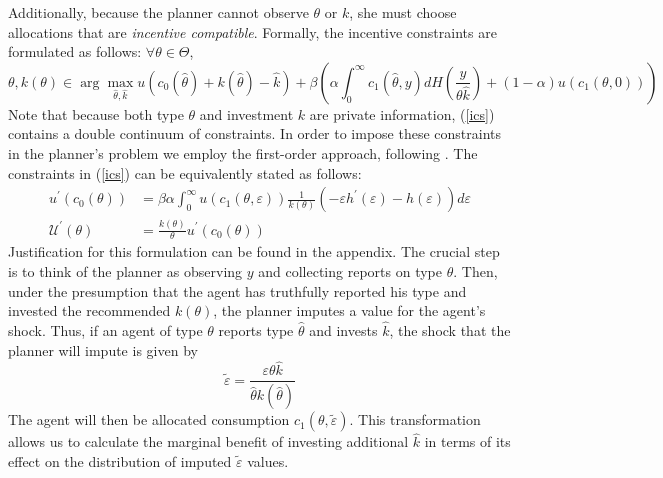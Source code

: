 \documentclass[11pt]{article}
\newcommand{\p}{\prime}
\newcommand{\U}{\mathcal{U}}
\begin{document}
Additionally, because the planner cannot observe \( \theta \) or \( k \), she must choose allocations that are \textit{incentive compatible}. Formally, the incentive constraints are formulated as follows: \( \forall \theta\in\Theta \),
\begin{equation}
    \theta, k(\theta)\in\arg\max_{\hat{\theta},\hat{k}}u\left( c_0(\hat{\theta}) + k(\hat{\theta}) - \hat{k} \right) + \beta\left( \alpha\int_{0}^{\infty}c_1(\hat{\theta},y)dH\left( \frac{y}{\theta \hat{k}} \right) + (1 - \alpha)u\left( c_1\left( \theta,0 \right) \right) \right) \label{ics}
\end{equation}
Note that because both type \( \theta \) and investment \( k \) are private information, (\ref{ics}) contains a double continuum of constraints. In order to impose these constraints in the planner's problem we employ the first-order approach, following \cite{jewitt1988justifying}. The constraints in (\ref{ics}) can be equivalently stated as follows:
\begin{align}
    u^\p\left( c_0(\theta) \right) &= \beta\alpha\int_{0}^{\infty}u\left( c_1\left( \theta,\varepsilon \right) \right)\frac{1}{k(\theta)}\left( -\varepsilon h^\p(\varepsilon) - h(\varepsilon) \right)d\varepsilon \label{ic_k} \\
    \U^\p(\theta) &= \frac{k(\theta)}{\theta}u^\p\left( c_0(\theta) \right) \label{ic_t}
\end{align}
Justification for this formulation can be found in the appendix. The crucial step is to think of the planner as observing \( y \) and collecting reports on type \( \theta \). Then, under the presumption that the agent has truthfully reported his type and invested the recommended \( k\left( \theta \right) \), the planner imputes a value for the agent's shock. Thus, if an agent of type \( \theta \) reports type \( \hat{\theta} \) and invests \( \hat{k} \), the shock that the planner will impute is given by 
\[\tilde{\varepsilon} = \frac{\varepsilon \theta \hat{k}}{\hat{\theta} k\left( \hat{\theta} \right)}\]
The agent will then be allocated consumption \( c_1(\theta,\tilde{\varepsilon}) \). This transformation allows us to calculate the marginal benefit of investing additional \( \hat{k} \) in terms of its effect on the distribution of imputed \( \tilde{\varepsilon} \) values. 
 
\end{document}
